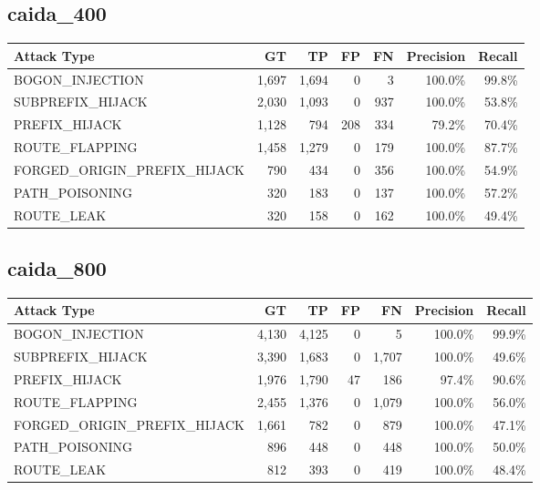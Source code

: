 \documentclass[10pt,a4paper]{article}
\begin{document}
\subsection{caida\_400}
\begin{table}[h]
\centering
\small
\begin{tabular}{lrrrrrr}
\toprule
Attack Type & GT & TP & FP & FN & Precision & Recall \\
\midrule

BOGON\_INJECTION & 1,697 & 1,694 & 0 & 3 & 100.0\% & 99.8\% \\
SUBPREFIX\_HIJACK & 2,030 & 1,093 & 0 & 937 & 100.0\% & 53.8\% \\
PREFIX\_HIJACK & 1,128 & 794 & 208 & 334 & 79.2\% & 70.4\% \\
ROUTE\_FLAPPING & 1,458 & 1,279 & 0 & 179 & 100.0\% & 87.7\% \\
FORGED\_ORIGIN\_PREFIX\_HIJACK & 790 & 434 & 0 & 356 & 100.0\% & 54.9\% \\
PATH\_POISONING & 320 & 183 & 0 & 137 & 100.0\% & 57.2\% \\
ROUTE\_LEAK & 320 & 158 & 0 & 162 & 100.0\% & 49.4\% \\
\bottomrule
\end{tabular}
\end{table}

\subsection{caida\_800}
\begin{table}[h]
\centering
\small
\begin{tabular}{lrrrrrr}
\toprule
Attack Type & GT & TP & FP & FN & Precision & Recall \\
\midrule

BOGON\_INJECTION & 4,130 & 4,125 & 0 & 5 & 100.0\% & 99.9\% \\
SUBPREFIX\_HIJACK & 3,390 & 1,683 & 0 & 1,707 & 100.0\% & 49.6\% \\
PREFIX\_HIJACK & 1,976 & 1,790 & 47 & 186 & 97.4\% & 90.6\% \\
ROUTE\_FLAPPING & 2,455 & 1,376 & 0 & 1,079 & 100.0\% & 56.0\% \\
FORGED\_ORIGIN\_PREFIX\_HIJACK & 1,661 & 782 & 0 & 879 & 100.0\% & 47.1\% \\
PATH\_POISONING & 896 & 448 & 0 & 448 & 100.0\% & 50.0\% \\
ROUTE\_LEAK & 812 & 393 & 0 & 419 & 100.0\% & 48.4\% \\
\bottomrule
\end{tabular}
\end{table}
\end{document}
